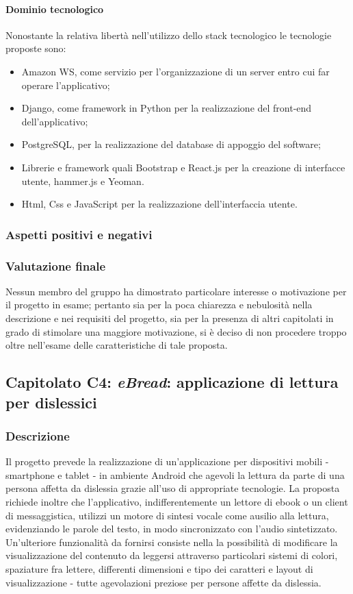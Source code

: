 			\paragraph{Dominio tecnologico}
			Nonostante la relativa libertà nell'utilizzo dello stack tecnologico le tecnologie proposte sono:
			\begin{itemize}
				\item Amazon WS, come servizio per l'organizzazione di un server entro cui far operare l'applicativo;
				\item Django, come framework in Python per la realizzazione del front-end dell'applicativo;
				\item PostgreSQL, per la realizzazione del database di appoggio del software;
				\item Librerie e framework quali Bootstrap e React.js per la creazione di interfacce utente, hammer.js e Yeoman.
				\item Html, Css e JavaScript per la realizzazione dell'interfaccia utente.
			\end{itemize}
		\subsubsection{Aspetti positivi e negativi}
		\subsubsection{Valutazione finale}
		Nessun membro del gruppo ha dimostrato particolare interesse o motivazione per il progetto in esame; pertanto sia per la poca chiarezza e 
		nebulosità nella descrizione e nei requisiti del progetto, sia per la presenza di altri capitolati in grado di stimolare una maggiore 
		motivazione, si è deciso di non procedere troppo oltre nell'esame delle caratteristiche di tale proposta.
		
	\subsection{Capitolato C4: \emph{eBread}: applicazione di lettura per dislessici}
		\subsubsection{Descrizione}
		Il progetto prevede la realizzazione di un'applicazione per dispositivi mobili - smartphone e tablet - in ambiente Android che agevoli la 
		lettura da parte di una persona affetta da dislessia grazie all'uso di appropriate tecnologie. La proposta richiede inoltre che l'applicativo, 
		indifferentemente un lettore di ebook o un client di messaggistica, utilizzi un motore di sintesi vocale come ausilio alla lettura, evidenziando 
		le parole del testo, in modo sincronizzato con l'audio sintetizzato. Un'ulteriore funzionalità da fornirsi consiste nella la possibilità di 
		modificare la visualizzazione del contenuto da leggersi attraverso particolari sistemi di colori, spaziature fra lettere, differenti dimensioni 
		e tipo dei caratteri e layout di visualizzazione - tutte agevolazioni preziose per persone affette da dislessia.

